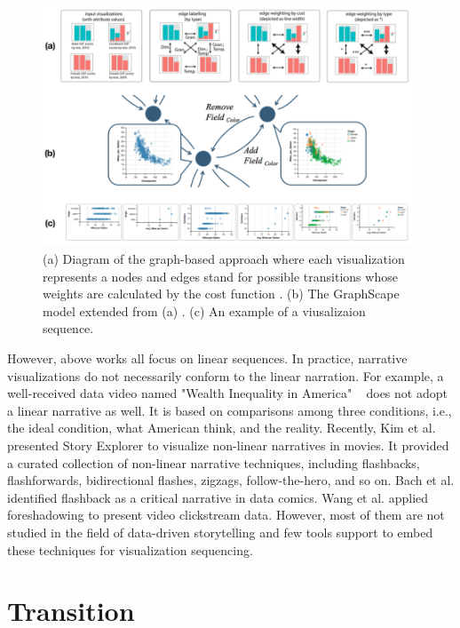 \begin{figure}[htb]
	\centering 
	\includegraphics[width=0.98\textwidth]{figure/GraphScale2.png} 
	\caption{ (a) Diagram of the graph-based approach where each visualization represents a nodes and edges stand for possible transitions whose weights are calculated by the cost function \cite{Hullman2013a}. (b) The GraphScape model extended from (a) \cite{Kim2017a}. (c) An example of a viusalizaion sequence. } 
	\label{GraphScale} 
\end{figure}

However, above works all focus on linear sequences. In practice, narrative visualizations do not necessarily conform to the linear narration. For example, a well-received data video named "Wealth Inequality in America" ~\cite{inequality} does not adopt a linear narrative as well. It is based on comparisons among three conditions, i.e., the ideal condition, what American think, and the reality. Recently, Kim et al. ~\cite{Kim2018} presented Story Explorer to visualize non-linear narratives in movies. It provided a curated collection of non-linear narrative techniques, including flashbacks, flashforwards, bidirectional flashes, zigzags, follow-the-hero, and so on. Bach et al. \cite{Bach2018} identified flashback as a critical narrative in data comics. Wang et al. \cite{Wang2016} applied foreshadowing to present video clickstream data. However, most of them are not studied in the field of data-driven storytelling and few tools support to embed these techniques for visualization sequencing.

\section{Transition}

